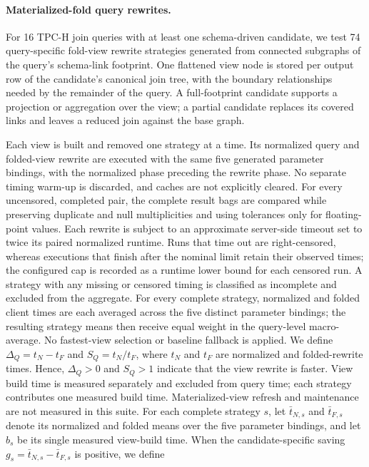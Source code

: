 \documentclass[sigconf]{acmart}
\begin{document}
\paragraph{Materialized-fold query rewrites.}
For 16 TPC-H join queries with at least one schema-driven candidate, we test 74
query-specific fold-view rewrite strategies generated from connected subgraphs
of the query's schema-link footprint. One flattened view node is stored per
output row of the candidate's canonical join tree, with the boundary
relationships needed by the remainder of the query. A full-footprint
candidate supports a projection or aggregation over the view; a partial
candidate replaces its covered links and leaves a reduced join against the
base graph.

Each view is built and removed one strategy at a time. Its normalized query
and folded-view rewrite are executed with the same five generated parameter
bindings, with the normalized phase preceding the rewrite phase. No separate
timing warm-up is discarded, and caches are not explicitly cleared. For every
uncensored, completed pair, the complete result bags are compared while
preserving duplicate and null multiplicities and using tolerances only for
floating-point values. Each rewrite is subject to an approximate server-side
timeout set to twice its paired normalized runtime.
Runs that time out are right-censored, whereas executions that finish after the
nominal limit retain their observed times; the configured cap is recorded as a
runtime lower bound for each censored run. A strategy with any missing or
censored timing is classified as incomplete and excluded from the aggregate.
For every complete strategy, normalized and folded client times are each
averaged across the five distinct parameter bindings; the resulting strategy
means then receive equal weight in the query-level macro-average.
No fastest-view selection or baseline fallback is applied. We define
$\Delta_Q=t_N-t_F$ and $S_Q=t_N/t_F$, where $t_N$ and $t_F$ are normalized and
folded-rewrite times. Hence, $\Delta_Q>0$ and $S_Q>1$ indicate that the view
rewrite is faster. View build time is measured separately and excluded from
query time; each strategy contributes one measured build time.
Materialized-view refresh and maintenance are not measured in this suite.
For each complete strategy $s$, let $\bar t_{N,s}$ and $\bar t_{F,s}$ denote
its normalized and folded means over the five parameter bindings, and let $b_s$
be its single measured view-build time. When the candidate-specific saving
$g_s=\bar t_{N,s}-\bar t_{F,s}$ is positive, we define
\end{document}
